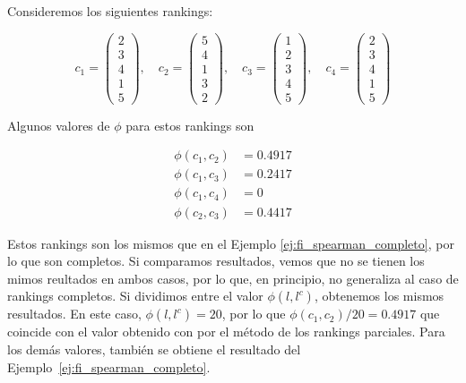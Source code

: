 \begin{ejemplo}
Consideremos los siguientes rankings:

\begin{equation*}
c_1 = \left( \begin{array}{c}
2\\
3\\
4\\
1\\
5
\end{array} \right), \quad
c_2 = \left( \begin{array}{c}
5\\
4\\
1\\
3\\
2
\end{array} \right), \quad
c_3 = \left( \begin{array}{c}
1\\
2\\
3\\
4\\
5
\end{array} \right), \quad
c_4 = \left( \begin{array}{c}
2\\
3\\
4\\
1\\
5
\end{array} \right)
\end{equation*}

Algunos valores de $\phi$ para estos rankings son

\begin{align*}
\phi(c_1, c_2) & = 0.4917 \\
\phi(c_1, c_3) & = 0.2417 \\
\phi(c_1, c_4) & = 0\\
\phi(c_2, c_3) & = 0.4417
\end{align*}  

Estos rankings son los mismos que en el Ejemplo \ref{ej:fi_spearman_completo}, por lo que son completos. Si comparamos resultados, vemos que no se tienen los mimos reultados en ambos casos, por lo que, en principio, no generaliza al caso de rankings completos. Si dividimos entre el valor $\phi(l, l^c)$, obtenemos los mismos resultados. En este caso, $\phi(l, l^c) = 20$, por lo que $\phi(c_1, c_2)/20 = 0.4917$ que coincide con el valor obtenido con por el método de los rankings parciales. Para los demás valores, también se obtiene el resultado del Ejemplo~\ref{ej:fi_spearman_completo}.\\


\end{ejemplo}
